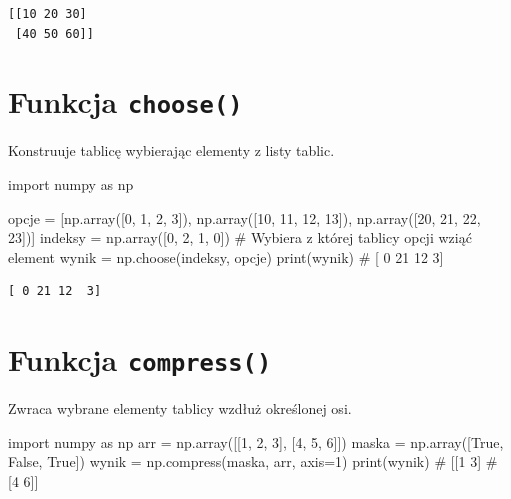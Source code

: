 \documentclass[
  polish,
  letterpaper,
  DIV=11,
  numbers=noendperiod]{scrreprt}
\newenvironment{Shaded}{\begin{snugshade}}{\end{snugshade}}
\newcommand{\BuiltInTok}[1]{\textcolor[rgb]{0.00,0.23,0.31}{#1}}
\newcommand{\CommentTok}[1]{\textcolor[rgb]{0.37,0.37,0.37}{#1}}
\newcommand{\DecValTok}[1]{\textcolor[rgb]{0.68,0.00,0.00}{#1}}
\newcommand{\ImportTok}[1]{\textcolor[rgb]{0.00,0.46,0.62}{#1}}
\newcommand{\NormalTok}[1]{\textcolor[rgb]{0.00,0.23,0.31}{#1}}
\newcommand{\OperatorTok}[1]{\textcolor[rgb]{0.37,0.37,0.37}{#1}}
\newcommand{\VariableTok}[1]{\textcolor[rgb]{0.07,0.07,0.07}{#1}}
\begin{document}
\begin{verbatim}
[[10 20 30]
 [40 50 60]]
\end{verbatim}

\section{\texorpdfstring{Funkcja
\texttt{choose()}}{Funkcja choose()}}\label{funkcja-choose}

Konstruuje tablicę wybierając elementy z listy tablic.

\begin{Shaded}
\begin{Highlighting}[]
\ImportTok{import}\NormalTok{ numpy }\ImportTok{as}\NormalTok{ np}

\NormalTok{opcje }\OperatorTok{=}\NormalTok{ [np.array([}\DecValTok{0}\NormalTok{, }\DecValTok{1}\NormalTok{, }\DecValTok{2}\NormalTok{, }\DecValTok{3}\NormalTok{]),}
\NormalTok{         np.array([}\DecValTok{10}\NormalTok{, }\DecValTok{11}\NormalTok{, }\DecValTok{12}\NormalTok{, }\DecValTok{13}\NormalTok{]),}
\NormalTok{         np.array([}\DecValTok{20}\NormalTok{, }\DecValTok{21}\NormalTok{, }\DecValTok{22}\NormalTok{, }\DecValTok{23}\NormalTok{])]}
\NormalTok{indeksy }\OperatorTok{=}\NormalTok{ np.array([}\DecValTok{0}\NormalTok{, }\DecValTok{2}\NormalTok{, }\DecValTok{1}\NormalTok{, }\DecValTok{0}\NormalTok{])  }\CommentTok{\# Wybiera z której tablicy opcji wziąć element}
\NormalTok{wynik }\OperatorTok{=}\NormalTok{ np.choose(indeksy, opcje)}
\BuiltInTok{print}\NormalTok{(wynik)  }\CommentTok{\# [ 0 21 12  3]}
\end{Highlighting}
\end{Shaded}

\begin{verbatim}
[ 0 21 12  3]
\end{verbatim}

\section{\texorpdfstring{Funkcja
\texttt{compress()}}{Funkcja compress()}}\label{funkcja-compress}

Zwraca wybrane elementy tablicy wzdłuż określonej osi.

\begin{Shaded}
\begin{Highlighting}[]
\ImportTok{import}\NormalTok{ numpy }\ImportTok{as}\NormalTok{ np}
\NormalTok{arr }\OperatorTok{=}\NormalTok{ np.array([[}\DecValTok{1}\NormalTok{, }\DecValTok{2}\NormalTok{, }\DecValTok{3}\NormalTok{], [}\DecValTok{4}\NormalTok{, }\DecValTok{5}\NormalTok{, }\DecValTok{6}\NormalTok{]])}
\NormalTok{maska }\OperatorTok{=}\NormalTok{ np.array([}\VariableTok{True}\NormalTok{, }\VariableTok{False}\NormalTok{, }\VariableTok{True}\NormalTok{])}
\NormalTok{wynik }\OperatorTok{=}\NormalTok{ np.compress(maska, arr, axis}\OperatorTok{=}\DecValTok{1}\NormalTok{)}
\BuiltInTok{print}\NormalTok{(wynik)}
\CommentTok{\# [[1 3]}
\CommentTok{\#  [4 6]]}
\end{Highlighting}
\end{Shaded}
\end{document}
